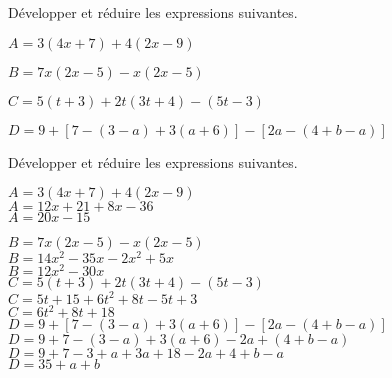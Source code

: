 \begin{exercice*}
    Développer et réduire les expressions suivantes.
    \begin{itemize}
         \begin{spacing}{1.2}
             \item[] $A= 3(4x+7)+4(2x-9)$
             \item[] $B= 7x(2x-5)-x(2x-5)$
             \item[] $C= 5(t+3)+2t(3t+4)-(5t-3)$
             \item[] $D= 9+[7-(3-a)+3(a+6)]-[2a-(4+b-a)]$
         \end{spacing}
    \end{itemize}
\end{exercice*}
\begin{corrige}
    Développer et réduire les expressions suivantes.
    \begin{itemize}
        \def\item{}
         \begin{spacing}{1.2}
            \item $A= 3(4x+7)+4(2x-9)$\\
            {\red $A= 12x+21+8x-36$\\$A= 20x-15$\\}
        \end{spacing}
    \end{itemize}
    \Coupe
    \begin{itemize}
        \def\item{}
         \begin{spacing}{1.2}
            \item $B= 7x(2x-5)-x(2x-5)$\\
            {\red $B= 14x^2-35x-2x^2+5x$\\$B= 12x^2-30x$\\}
            \item $C= 5(t+3)+2t(3t+4)-(5t-3)$\\
            {\red $C= 5t+15+6t^2+8t-5t+3$\\$C=6t^2+8t+18$\\}
            \item $D= 9+[7-(3-a)+3(a+6)]-[2a-(4+b-a)]$\\
            {\red $D= 9+7-(3-a)+3(a+6)-2a+(4+b-a)$\\$D= 9+7-3+a+3a+18-2a+4+b-a$\\$D=35+a+b$}
         \end{spacing}
    \end{itemize}
\end{corrige}

